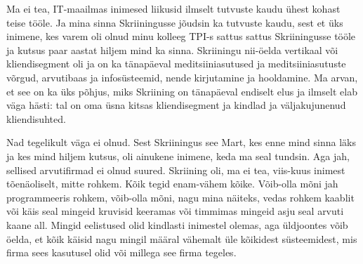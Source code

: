 
Ma ei tea, IT-maailmas inimesed liikusid ilmselt tutvuste kaudu ühest kohast 
teise tööle. Ja mina sinna Skriiningusse jõudsin ka  tutvuste 
kaudu, sest et üks inimene, kes varem oli olnud minu kolleeg TPI-s sattus 
sattus Skriiningusse tööle ja kutsus paar aastat hiljem mind ka sinna. 
Skriiningu nii-öelda vertikaal või kliendisegment oli ja on ka tänapäeval 
meditsiiniasutused ja meditsiiniasutuste võrgud, arvutibaas ja infosüsteemid, 
nende kirjutamine ja hooldamine. Ma arvan, et see on ka üks põhjus, miks 
Skriining on tänapäeval  endiselt elus ja ilmselt elab väga hästi: tal on oma 
üsna kitsas kliendisegment ja kindlad ja väljakujunenud kliendisuhted.


Nad tegelikult väga ei olnud. Sest Skriiningus see Mart, kes enne mind sinna 
läks ja kes mind hiljem kutsus, oli ainukene inimene, keda ma seal tundsin. Aga 
jah, sellised arvutifirmad ei olnud suured. Skriining oli, ma ei tea, viis-kuus 
inimest tõenäoliselt, mitte rohkem. Kõik tegid  enam-vähem kõike. Võib-olla 
mõni jah programmeeris rohkem, võib-olla mõni, nagu mina näiteks, vedas rohkem 
kaablit või käis seal mingeid kruvisid keeramas või timmimas mingeid asju seal 
arvuti kaane all. Mingid eelistused olid kindlasti inimestel olemas, aga 
üldjoontes võib öelda, et kõik käisid nagu mingil määral vähemalt üle kõikidest 
 süsteemidest, mis firma  sees kasutusel olid või millega see firma tegeles.


